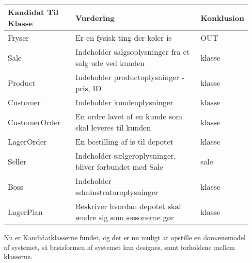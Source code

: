 \begin{longtable}{ |p{120pt}|p{120pt}|p{120pt}| }\label{fig:Kandidatklasser}
    \textbf{Kandidat Til Klasse} & \textbf{Vurdering} & \textbf{Konklusion} \\
    \hline
    Fryser & Er en fysisk ting der køler is & OUT \\
    \hline
    Sale & Indeholder salgsoplysninger fra et salg ude ved kunden & klasse \\
    \hline
    Product & Indeholder productoplysninger - pris, ID & klasse \\
    \hline
    Customer & Indeholder kundeoplysninger & klasse \\
    \hline
    CustomerOrder & En ordre lavet af en kunde som skal leveres til kunden & klasse \\
    \hline
    LagerOrder & En bestilling af is til depotet & klasse \\
    \hline
    Seller & Indeholder sælgeroplysninger, bliver forbundet med Sale & sale \\
    \hline
    Boss & Indeholder adminstratoroplysninger & klasse \\
    \hline
    LagerPlan & Beskriver hvordan depotet skal ændre sig som sæsonerne gør & klasse \\
    \hline
\end{longtable}
Nu er Kandidatklasserne fundet, og det er nu muligt at opstille en domænemodel af systemet, så basisformen af systemet kan designes, samt forholdene mellem klasserne.
